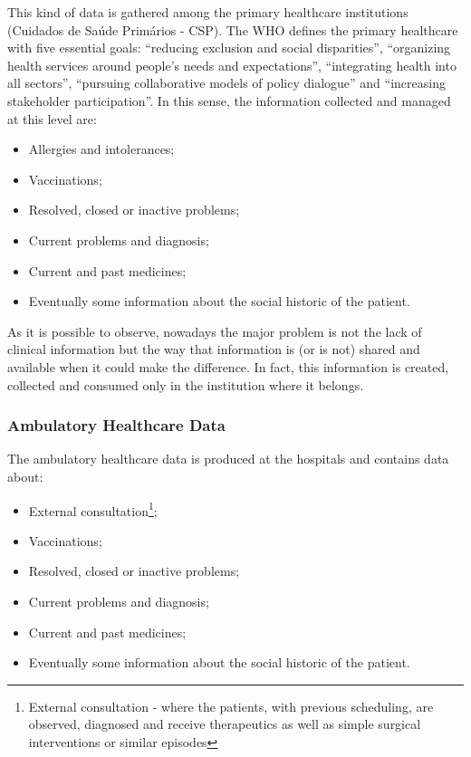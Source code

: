 This kind of data is gathered among the primary healthcare institutions (Cuidados de Saúde Primários - CSP). The WHO defines the primary healthcare with five essential goals: ``reducing exclusion and social disparities'', ``organizing health services around people's needs and expectations'', ``integrating health into all sectors'', ``pursuing collaborative models of policy dialogue'' and ``increasing stakeholder participation''. In this sense, the information collected and managed at this level are:
\begin{itemize}
\item Allergies and intolerances;
\item Vaccinations;
\item Resolved, closed or inactive problems;
\item Current problems and diagnosis;
\item Current and past medicines;
\item Eventually some information about the social historic of the patient.
\end{itemize}

As it is possible to observe, nowadays the major problem is not the lack of clinical information but the way that information is (or is not) shared and available when it could make the difference. In fact, this information is created, collected and consumed only in the institution where it belongs.


\subsubsection{Ambulatory Healthcare Data} \label{sec:hosp_data}

The ambulatory healthcare data is produced at the hospitals and contains data about:
\begin{itemize}
\item External consultation\footnote{External consultation - where the patients, with previous scheduling, are observed, diagnosed and receive therapeutics as well as simple surgical interventions or similar episodes};
\item Vaccinations;
\item Resolved, closed or inactive problems;
\item Current problems and diagnosis;
\item Current and past medicines;
\item Eventually some information about the social historic of the patient.
\end{itemize}

